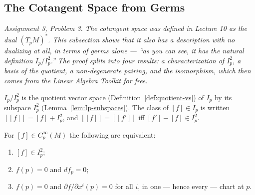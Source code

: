 \documentclass[11pt]{report}
\makeatletter
\newcounter{defcounter}[section]
\newcounter{thmcounter}[section]
\newcommand{\thmlabel}[1]{\edef\@currentlabel{\arabic{section}.\arabic{thmcounter}}\label{#1}}
\newcommand{\deflabel}[1]{\edef\@currentlabel{\arabic{section}.\arabic{defcounter}}\label{#1}}
\newcommand{\leeref}[1]{\par\smallskip{\raggedleft\footnotesize\textsc{Lee}:\ #1\par}}
\makeatother
\begin{document}
\subsection{The Cotangent Space from Germs}\label{sub:cotangent-germs}

\textit{Assignment 3, Problem 3. The cotangent space was defined in Lecture 10 as the dual $(T_pM)^*$. This subsection shows that it also has a description with no dualizing at all, in terms of germs alone --- ``as you can see, it has the natural definition $I_p/I_p^2$.'' The proof splits into four results: a characterization of $I_p^2$, a basis of the quotient, a non-degenerate pairing, and the isomorphism, which then comes from the Linear Algebra Toolkit for free.}

\begin{defbox}\deflabel{def:Ip-quotient}
$I_p/I_p^2$ is the quotient vector space (Definition~\ref{def:quotient-vs}) of $I_p$ by its subspace $I_p^2$ (Lemma~\ref{lem:Ip-subspaces}). The class of $[f] \in I_p$ is written $[[f]] = [f] + I_p^2$, and $[[f]] = [[f']]$ iff $[f'] - [f] \in I_p^2$.
\end{defbox}

\begin{propbox}\thmlabel{prop:second-order}
For $[f] \in C_p^\infty(M)$ the following are equivalent:
\begin{enumerate}
    \item $[f] \in I_p^2$;
    \item $f(p) = 0$ and $df_p = 0$;
    \item $f(p) = 0$ and $\partial f/\partial x^i(p) = 0$ for all $i$, in one --- hence every --- chart at $p$.
\end{enumerate}
\leeref{Problem 11-4(a)}
\end{propbox}
\end{document}
